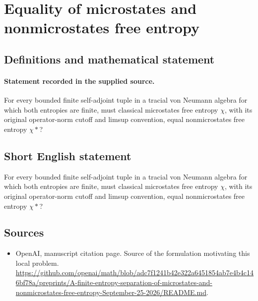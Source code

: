 \documentclass[11pt]{article}
\begin{document}
\section*{Equality of microstates and nonmicrostates free entropy}\label{statement}
\subsection{Definitions and mathematical statement}
\paragraph{Statement recorded in the supplied source.}
For every bounded finite self-adjoint tuple in a tracial von Neumann algebra for which both entropies are finite, must classical microstates free entropy $\chi $, with its original operator-norm cutoff and limsup convention, equal nonmicrostates free entropy $\chi *$?
\subsection{Short English statement}
For every bounded finite self-adjoint tuple in a tracial von Neumann algebra for which both entropies are finite, must classical microstates free entropy $\chi $, with its original operator-norm cutoff and limsup convention, equal nonmicrostates free entropy $\chi *$?
\subsection{Sources}
\begin{itemize}
\item[S1] OpenAI, manuscript citation page. Source of the formulation motivating this local problem.
\url{https://github.com/openai/math/blob/adc7f1241b42e322a6451854ab7e4b4c146bf78a/preprints/A-finite-entropy-separation-of-microstates-and-nonmicrostates-free-entropy-September-25-2026/README.md}.
\end{itemize}
\end{document}
